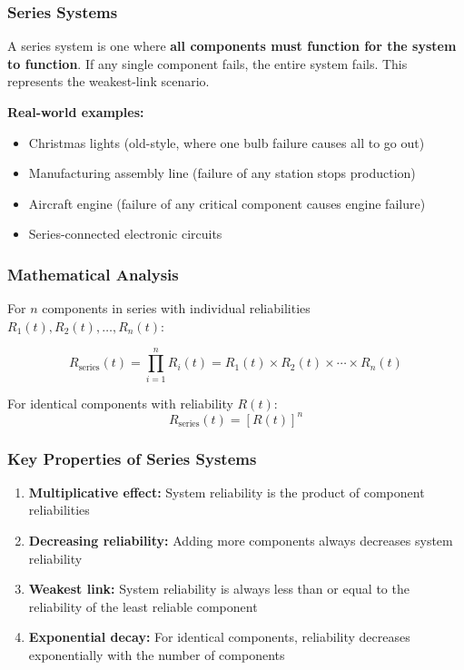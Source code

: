 \documentclass[twoside]{book}
\begin{document}
\subsubsection{Series Systems}

A series system is one where \textbf{all components must function for the system to function}. If any single component fails, the entire system fails. This represents the weakest-link scenario.

\textbf{Real-world examples:}
\begin{itemize}
    \item Christmas lights (old-style, where one bulb failure causes all to go out)
    \item Manufacturing assembly line (failure of any station stops production)
    \item Aircraft engine (failure of any critical component causes engine failure)
    \item Series-connected electronic circuits
\end{itemize}

\subsubsection{Mathematical Analysis}

For $n$ components in series with individual reliabilities $R_1(t), R_2(t), \ldots, R_n(t)$:

\begin{equation}
R_{\text{series}}(t) = \prod_{i=1}^n R_i(t) = R_1(t) \times R_2(t) \times \cdots \times R_n(t)
\end{equation}

For identical components with reliability $R(t)$:
\begin{equation}
R_{\text{series}}(t) = [R(t)]^n
\end{equation}

\subsubsection{Key Properties of Series Systems}
\begin{enumerate}
    \item \textbf{Multiplicative effect:} System reliability is the product of component reliabilities
    \item \textbf{Decreasing reliability:} Adding more components always decreases system reliability
    \item \textbf{Weakest link:} System reliability is always less than or equal to the reliability of the least reliable component
    \item \textbf{Exponential decay:} For identical components, reliability decreases exponentially with the number of components
\end{enumerate}
\end{document}
